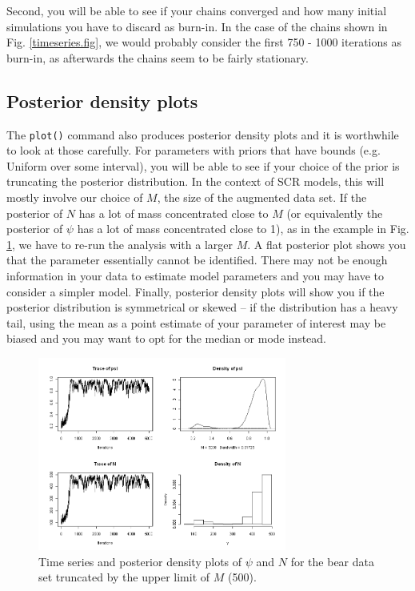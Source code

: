 Second, you will be able to see if your chains converged and how many initial simulations you have to discard as burn-in. In the case of the chains shown in Fig. \ref{timeseries.fig}, we would probably consider the first 750 - 1000 iterations as burn-in, as afterwards the chains seem to be fairly stationary.

\subsection{Posterior density plots}
The \verb#plot()# command also produces posterior density plots and it is worthwhile to look at those carefully. For parameters with priors that have bounds (e.g. Uniform over some interval), you will be able to see if your choice of the prior is truncating the posterior distribution. In the context of SCR models, this will mostly involve our choice of $M$, the size of the augmented data set. If the posterior of $N$ has a lot of mass concentrated close to $M$ (or equivalently the posterior of $\psi$ has a lot of mass concentrated close to 1), as in the example in Fig. \ref{timeseries2.fig}, we have to re-run the analysis with a larger $M$.  A flat posterior plot shows you that the parameter essentially cannot be identified. There may not be enough information in your data to estimate model parameters and you may have to consider a simpler model. Finally, posterior density plots will show you if the posterior distribution is symmetrical or skewed -- if the distribution has a heavy tail, using the mean as a point estimate of your parameter of interest may be biased and you may want to opt for the median or mode instead.

\begin{figure}
\begin{center}
\includegraphics[height=2.5in]{Ch7/figs/timeseries2}
\end{center}
\caption{Time series and posterior density plots of $\psi$ and $N$ for the bear data set truncated by the upper limit of $M$ (500).}
\label{timeseries2.fig}
\end{figure}

